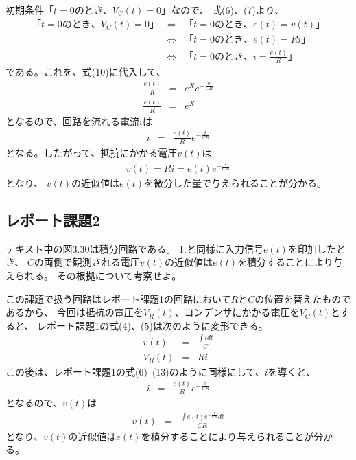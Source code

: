 \documentclass[12pt]{jarticle}
\begin{document}
初期条件「$t=0$のとき、$V_C(t)=0$」なので、
式(6)、(7)より、
\begin{eqnarray}
    「t=0のとき、V_C(t)=0」&\Leftrightarrow& 「t=0のとき、e(t)=v(t)」\nonumber\\
    &\Leftrightarrow&「t=0のとき、e(t)=Ri」\nonumber\\
    &\Leftrightarrow&「t=0のとき、i=\frac{e(t)}{R}」
\end{eqnarray}
である。これを、式(10)に代入して、
\begin{eqnarray}
    \frac{e(t)}{R}&=&e^Xe^{-\frac{0}{CR}}\nonumber\\
    \frac{e(t)}{R}&=&e^X
\end{eqnarray}
となるので、回路を流れる電流$i$は
\begin{eqnarray}
    i&=& \frac{e(t)}{R}e^{-\frac{t}{CR}}
\end{eqnarray}
となる。したがって、抵抗にかかる電圧$v(t)$は
\begin{eqnarray}
    v(t)=Ri=e(t)e^{-\frac{t}{CR}}
\end{eqnarray}
となり、 $v(t)$の近似値は$e(t)$を微分した量で与えられることが分かる。

\subsection{レポート課題2}
\begin{shadebox}
    テキスト中の図3.30は積分回路である。
    1.と同様に入力信号$e(t)$を印加したとき、
    $C$の両側で観測される電圧$v(t)$の近似値は$e(t)$を積分することにより与えられる。
    その根拠について考察せよ。
\end{shadebox}
この課題で扱う回路はレポート課題1の回路において$R$と$C$の位置を替えたものであるから、
今回は抵抗の電圧を$V_R(t)$、コンデンサにかかる電圧を$V_C(t)$とすると、
レポート課題1の式(4)、(5)は次のように変形できる。
\begin{eqnarray}
    v(t)&=&\frac{\int idt}{C}\\
    V_R(t)&=&Ri
\end{eqnarray}
この後は、レポート課題1の式(6)~(13)のように同様にして、$i$を導くと、
\begin{eqnarray}
    i&=& \frac{e(t)}{R}e^{-\frac{t}{CR}}
\end{eqnarray}
となるので、$v(t)$は
\begin{eqnarray}
    v(t)&=&\frac{\int e(t)e^{-\frac{t}{CR}}dt}{CR}\nonumber
\end{eqnarray}
となり、$v(t)$の近似値は$e(t)$を積分することにより与えられることが分かる。
\end{document}
